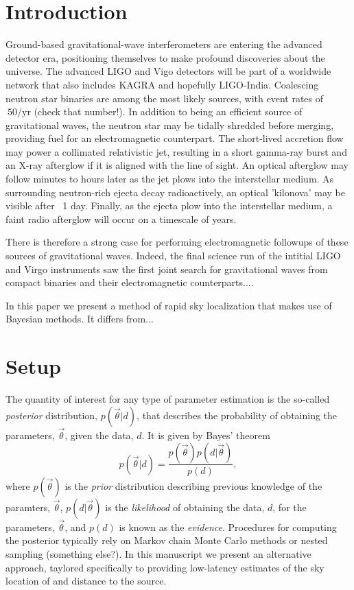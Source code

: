 \documentclass{iopart}
\begin{document}
\section{Introduction}

Ground-based gravitational-wave interferometers are entering the advanced detector era, positioning themselves to make profound discoveries about the universe.  The advanced LIGO and Vigo detectors will be part of a worldwide network that also includes KAGRA and hopefully LIGO-India.  Coalescing neutron star binaries are among the most likely sources, with event rates of $~ 50/\mathrm{yr}$ (check that number!).  In addition to being an efficient source of gravitational waves, the neutron star may be tidally shredded before merging, providing fuel for an electromagnetic counterpart.  The short-lived accretion flow may power a collimated relativistic jet, resulting in a short gamma-ray burst and an X-ray afterglow if it is aligned with the line of sight. An optical afterglow may follow minutes to hours later as the jet plows into the interstellar medium. As surrounding neutron-rich ejecta decay radioactively, an optical 'kilonova' may be visible after ~1 day. Finally, as the ejecta plow into the interstellar medium, a faint radio afterglow will occur on a timescale of years.

There is therefore a strong case for performing electromagnetic followups of these sources of gravitational waves.  Indeed, the final science run of the intitial LIGO and Virgo instruments saw the first joint search for gravitational waves from compact binaries and their electromagnetic counterparts....

In this paper we present a method of rapid sky localization that makes use of Bayesian methods.  It differs from...

\section{Setup}

The quantity of interest for any type of parameter estimation is the so-called {\it posterior} distribution, $p(\vec{\theta}|d)$, that describes the probability of obtaining the parameters, $\vec{\theta}$, given the data, $d$.  It is given by Bayes' theorem
\begin{equation}\label{bayes}
p(\vec{\theta}|d) = \frac{p(\vec{\theta})p(d|\vec{\theta})}{p(d)},
\end{equation}
where $p(\vec{\theta})$ is the {\it prior} distribution describing previous knowledge of the paramters, $\vec{\theta}$, $p(d|\vec{\theta})$ is the {\it likelihood} of obtaining the data, $d$, for the parameters, $\vec{\theta}$, and $p(d)$ is known as the {\it evidence}.  Procedures for computing the posterior typically rely on Markov chain Monte Carlo methods or nested sampling (something else?).  In this manuscript we present an alternative approach, taylored specifically to providing low-latency estimates of the sky location of and distance to the source.
\end{document}
